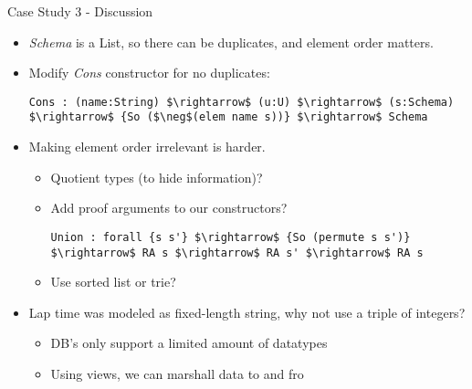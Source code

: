 \documentclass[10pt]{beamer}
\begin{document}
\begin{frame}[fragile]{Case Study 3 - Discussion}

\begin{itemize}
\item \textit{Schema} is a List, so there can be duplicates, and element order matters.
\item Modify \textit{Cons} constructor for no duplicates:
\begin{lstlisting}[mathescape=true]
	Cons : (name:String) $\rightarrow$ (u:U) $\rightarrow$ (s:Schema) $\rightarrow$ {So ($\neg$(elem name s))} $\rightarrow$ Schema
\end{lstlisting}
\item Making element order irrelevant is harder.
	\begin{itemize}
	\item Quotient types (to hide information)?
	\item Add proof arguments to our constructors?
	\begin{lstlisting}[mathescape=true]
	Union : forall {s s'} $\rightarrow$ {So (permute s s')} $\rightarrow$ RA s $\rightarrow$ RA s' $\rightarrow$ RA s
	\end{lstlisting}
	\item Use sorted list or trie?
	\end{itemize}
\item Lap time was modeled as fixed-length string, why not use a triple of integers?
	\begin{itemize}
	\item DB's only support a limited amount of datatypes
	\item Using views, we can marshall data to and fro
	\end{itemize}
\end{itemize}

\end{frame}
\end{document}

